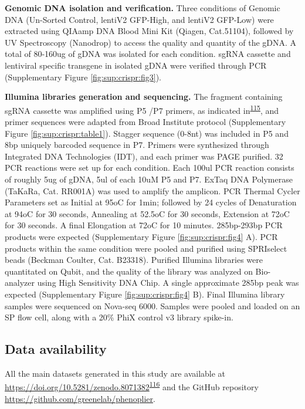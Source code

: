 \documentclass[
  a4paper,
]{article}
\begin{document}
\textbf{Genomic DNA isolation and verification.}
Three conditions of Genomic DNA (Un-Sorted Control, lentiV2 GFP-High, and lentiV2 GFP-Low) were extracted using QIAamp DNA Blood Mini Kit (Qiagen, Cat.51104), followed by UV Spectroscopy (Nanodrop) to access the quality and quantity of the gDNA.
A total of 80-160ug of gDNA was isolated for each condition.
sgRNA cassette and lentiviral specific transgene in isolated gDNA were verified through PCR (Supplementary Figure \ref{fig:sup:crispr:fig3}).

\textbf{Illumina libraries generation and sequencing.}
The fragment containing sgRNA cassette was amplified using P5 /P7 primers, as indicated in\textsuperscript{\protect\hyperlink{ref-vNXTnmxp}{115}}, and primer sequences were adapted from Broad Institute protocol (Supplementary Figure \ref{fig:sup:crispr:table1}).
Stagger sequence (0-8nt) was included in P5 and 8bp uniquely barcoded sequence in P7.
Primers were synthesized through Integrated DNA Technologies (IDT), and each primer was PAGE purified.
32 PCR reactions were set up for each condition.
Each 100ul PCR reaction consists of roughly 5ug of gDNA, 5ul of each 10uM P5 and P7.
ExTaq DNA Polymerase (TaKaRa, Cat. RR001A) was used to amplify the amplicon.
PCR Thermal Cycler Parameters set as Initial at 95oC for 1min; followed by 24 cycles of Denaturation at 94oC for 30 seconds, Annealing at 52.5oC for 30 seconds, Extension at 72oC for 30 seconds.
A final Elongation at 72oC for 10 minutes.
285bp-293bp PCR products were expected (Supplementary Figure \ref{fig:sup:crispr:fig4} A).
PCR products within the same condition were pooled and purified using SPRIselect beads (Beckman Coulter, Cat. B23318).
Purified Illumina libraries were quantitated on Qubit, and the quality of the library was analyzed on Bio-analyzer using High Sensitivity DNA Chip.
A single approximate 285bp peak was expected (Supplementary Figure \ref{fig:sup:crispr:fig4} B).
Final Illumina library samples were sequenced on Nova-seq 6000.
Samples were pooled and loaded on an SP flow cell, along with a 20\% PhiX control v3 library spike-in.

\hypertarget{data-availability}{%
\subsection{Data availability}\label{data-availability}}

All the main datasets generated in this study are available at \url{https://doi.org/10.5281/zenodo.8071382}\textsuperscript{\protect\hyperlink{ref-cygmsEBt}{116}} and the GitHub repository \url{https://github.com/greenelab/phenoplier}.
\end{document}
